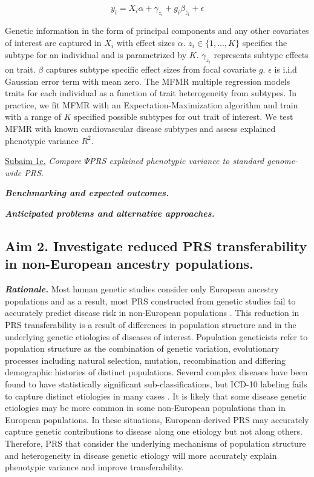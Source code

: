 \documentclass[11pt]{article}  %
\newlength\tindent
\renewcommand{\indent}{\hspace*{\tindent}}
\begin{document}
$$
y_i = X_i \alpha + \gamma_{z_i} + g_i \beta_{z_i} + \epsilon
$$

Genetic information in the form of principal components and any other covariates of interest are captured in $X_i$ with effect sizes $\alpha$. $z_i \in \{1,...,K\}$ specifies the subtype for an individual and is parametrized by $K$. $\gamma_{z_i}$ represents subtype effects on trait. $\beta$ captures subtype specific effect sizes from focal covariate $g$. $\epsilon$ is i.i.d Gaussian error term with mean zero. The MFMR multiple regression models traits for each individual as a function of trait heterogeneity from subtypes. In practice, we fit MFMR with an Expectation-Maximization algorithm and train with a range of $K$ specified possible subtypes for out trait of interest. We test MFMR with known cardiovascular disease subtypes \cite{mordi_differential_2019} and assess explained phenotypic variance $R^2$.  


\indent \underline{Subaim 1c.} \textit{Compare $\Psi$PRS explained phenotypic variance to standard genome-wide PRS.}

\indent \textbf{\textit{Benchmarking and expected outcomes.}}


\indent \textbf{\textit{Anticipated problems and alternative approaches.}}

\subsection*{Aim 2. Investigate reduced PRS transferability in non-European ancestry populations.}

\indent \textbf{\textit{Rationale.}} Most human genetic studies consider only European ancestry populations and as a result, most PRS constructed from genetic studies fail to accurately predict disease risk in non-European populations \cite{wojcik_genetic_2019}. This reduction in PRS transferability is a result of differences in population structure and in the underlying genetic etiologies of diseases of interest. Population geneticists refer to population structure as the combination of genetic variation, evolutionary processes including natural selection, mutation, recombination and differing demographic histories of distinct populations. Several complex diseases have been found to have statistically significant sub-classifications, but ICD-10 labeling fails to capture distinct etiologies in many cases \cite{???}. It is likely that some disease genetic etiologies may be more common in some non-European populations than in European populations. In these situations, European-derived PRS may accurately capture genetic contributions to disease along one etiology but not along others. Therefore, PRS that consider the underlying mechanisms of population structure and heterogeneity in disease genetic etiology will more accurately explain phenotypic variance and improve transferability.         
\end{document}
